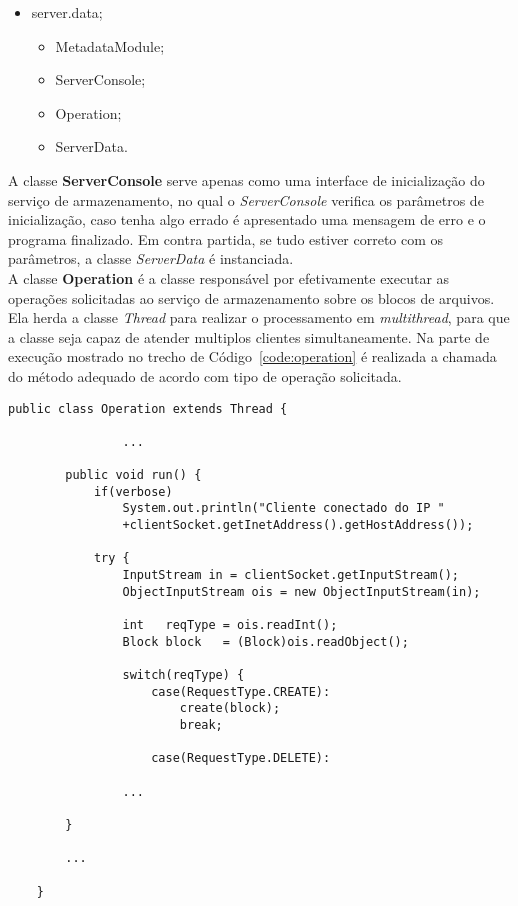 \begin{itemize}
	\item server.data;
	\begin{itemize}
	\item MetadataModule;
	\item ServerConsole;
	\item Operation;
	\item ServerData.
	\end{itemize}
\end{itemize}

A classe \textbf{ServerConsole} serve apenas como uma interface de inicialização do serviço de armazenamento, no qual o \textit{ServerConsole} verifica os parâmetros de inicialização, caso tenha algo errado é apresentado uma mensagem de erro e o programa finalizado. Em contra partida, se tudo estiver correto com os parâmetros, a classe \textit{ServerData} é instanciada.
\\

A classe \textbf{Operation} é a classe responsável por efetivamente executar as operações solicitadas ao serviço de armazenamento sobre os blocos de arquivos. Ela herda a classe \textit{Thread} para realizar o processamento em \textit{multithread}, para que a classe seja capaz de atender multiplos clientes simultaneamente. Na parte de execução mostrado no trecho de Código~\ref{code:operation} é realizada a chamada do método adequado de acordo com tipo de operação solicitada.
\\

\begin{lstlisting}[basicstyle=\ttfamily\footnotesize, frame=single, caption=Declaração e o método de execução da classe Operation, label=code:operation]		
	public class Operation extends Thread {
		
				...
				
		public void run() {
			if(verbose)
				System.out.println("Cliente conectado do IP "
				+clientSocket.getInetAddress().getHostAddress());
			
			try {
				InputStream in = clientSocket.getInputStream();
				ObjectInputStream ois = new ObjectInputStream(in);
				
				int   reqType = ois.readInt();
				Block block   = (Block)ois.readObject();
				
				switch(reqType) {
					case(RequestType.CREATE):
						create(block);
						break;
				
					case(RequestType.DELETE):
				
				...
				
		}
		
		...
		
	}
\end{lstlisting}

